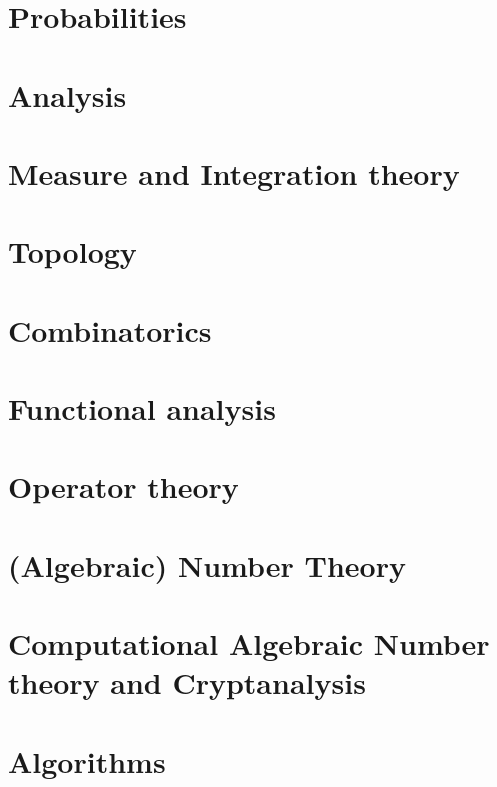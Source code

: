 \documentclass{scrartcl}
\begin{document}


\section{Probabilities}



\section{Analysis}



\section{Measure and Integration theory}



\section{Topology}



\section{Combinatorics}



\section{Functional analysis}



\section{Operator theory}



\section{(Algebraic) Number Theory}



\section{Computational Algebraic Number theory and Cryptanalysis}



\section{Algorithms}


\end{document}
